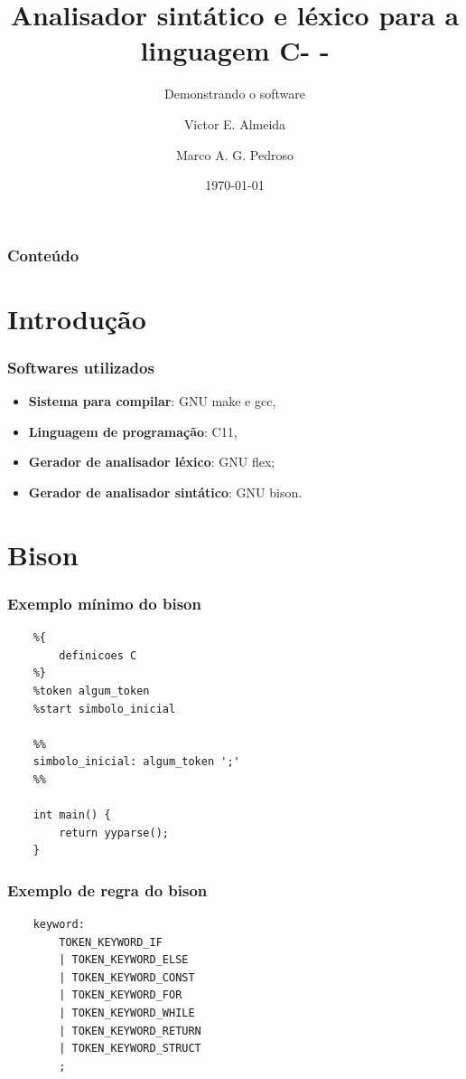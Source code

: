 \documentclass[12pt]{beamer}
\author[Grupo: c--]{Victor E. Almeida \and Marco A. G. Pedroso}
\title{Analisador sintático e léxico para a linguagem C- -}
\subtitle{Demonstrando o software}
\date{\today}
\institute{UNIOESTE}
\begin{document}
\frame{\titlepage}

\begin{frame}
\frametitle{Conteúdo}
\tableofcontents
\end{frame}

\section{Introdução}\label{Introdução}
\begin{frame}
    \frametitle{Softwares utilizados}
    \begin{itemize}
        \item \textbf{Sistema para compilar}: GNU make e gcc,
        \item \textbf{Linguagem de programação}: C11,
        \item \textbf{Gerador de analisador léxico}: GNU flex;
        \item \textbf{Gerador de analisador sintático}: GNU bison.
    \end{itemize}
\end{frame}


\section{Bison}\label{Bison}
\begin{frame}[t,fragile]{\insertsectionhead}
    \frametitle{Exemplo mínimo do bison}
    \begin{lstlisting}
    %{
        definicoes C
    %}
    %token algum_token
    %start simbolo_inicial

    %%
    simbolo_inicial: algum_token ';'
    %%

    int main() {
        return yyparse();
    }
    \end{lstlisting}
\end{frame}

\begin{frame}[t,fragile]{\insertsectionhead}
    \frametitle{Exemplo de regra do bison}

    \begin{center}
        
    \begin{lstlisting}
    keyword:
	    TOKEN_KEYWORD_IF
	    | TOKEN_KEYWORD_ELSE
	    | TOKEN_KEYWORD_CONST
	    | TOKEN_KEYWORD_FOR
	    | TOKEN_KEYWORD_WHILE
	    | TOKEN_KEYWORD_RETURN
	    | TOKEN_KEYWORD_STRUCT
	    ;
    \end{lstlisting}
    \end{center}
    
\end{frame}
\end{document}
